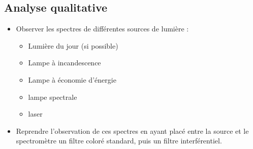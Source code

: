 \documentclass{tp}
\begin{document}
\subsection{Analyse qualitative}%
\label{sub:analyse_qualitative}

\begin{itemize}
  \item Observer les spectres de différentes sources de lumière :
  \begin{itemize}
    \item Lumière du jour (si possible)
    \item Lampe à incandescence
    \item Lampe à économie d'énergie
    \item lampe spectrale
    \item laser
  \end{itemize}
  \item Reprendre l'observation de ces spectres en ayant placé entre la source et le spectromètre un filtre coloré standard, puis un filtre interférentiel.
\end{itemize}
\end{document}
